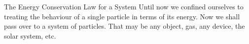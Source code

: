 \documentclass[18pt]{LectMechanics}
\begin{document}
\begin{frame}{The Energy Conservation Law for a System}{}
Until now we confined ourselves to treating the behaviour of a single particle in terms of its energy. Now we shall pass over to a system of particles. That may be any object, gas, any device, the solar system, etc.

\end{frame}
\end{document}
